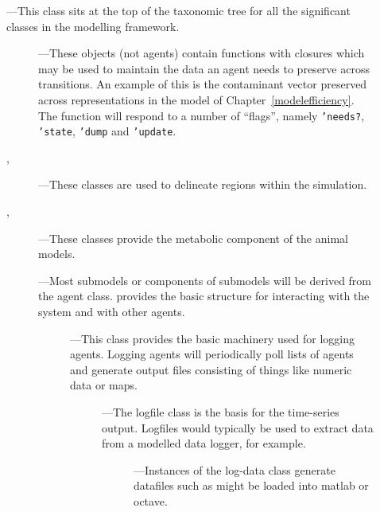 \begin{description}
\item[]---This class sits at the top of the taxonomic tree
  for all the significant classes in the modelling framework.

  \begin{description}
  \item[]---These objects (not agents) contain
    functions with closures which may be used to maintain the data an
    agent needs to preserve across transitions.  An example of this is
    the contaminant vector preserved across representations in the model
    of Chapter~\ref{modelefficiency}.  The function will respond to a
    number of ``flags'', namely \texttt{'needs?}, \texttt{'state},
    \texttt{'dump} and \texttt{'update}.

  \item[, ]---These classes are used to
    delineate regions within the simulation.  

  \item[, ]---These classes
    provide the metabolic component of the animal models.
    
    
  \item[]---Most submodels or components of submodels
    will be derived from the agent class.   provides the
    basic structure for interacting with the system and with other
    agents.

    \begin{description}
    \item[]---This class provides the basic machinery
      used for logging agents.  Logging agents will periodically poll
      lists of agents and generate output files consisting of things
      like numeric data or maps.

      \begin{description}
      \item[]---The logfile class is the basis for the
        time-series output. Logfiles would typically be used to
        extract data from a modelled data logger, for example.
        
        \begin{description}
        \item[]---Instances of the log-data class
          generate datafiles such as might be loaded into matlab or
          octave.
        \end{description}
        

\end{description}
\end{description}
\end{description}
\end{description}
